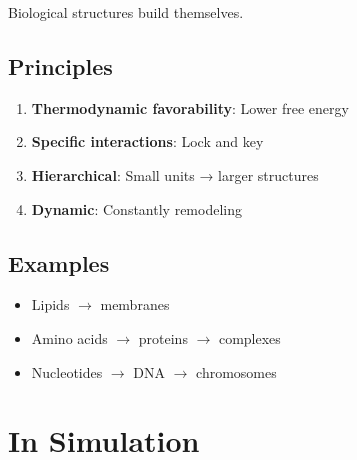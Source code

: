 \documentclass[
  11pt,
  letterpaper,
  twoside,
  openright]{book}
\providecommand{\tightlist}{%
  \setlength{\itemsep}{0pt}\setlength{\parskip}{0pt}}
\begin{document}
Biological structures build themselves.

\subsection{Principles}\label{principles}

\begin{enumerate}
\def\labelenumi{\arabic{enumi}.}
\tightlist
\item
  \textbf{Thermodynamic favorability}: Lower free energy
\item
  \textbf{Specific interactions}: Lock and key
\item
  \textbf{Hierarchical}: Small units → larger structures
\item
  \textbf{Dynamic}: Constantly remodeling
\end{enumerate}

\subsection{Examples}\label{examples}

\begin{itemize}
\tightlist
\item
  Lipids \(\to\) membranes
\item
  Amino acids \(\to\) proteins \(\to\) complexes
\item
  Nucleotides \(\to\) DNA \(\to\) chromosomes
\end{itemize}

\section{In Simulation}\label{in-simulation-6}
\end{document}
